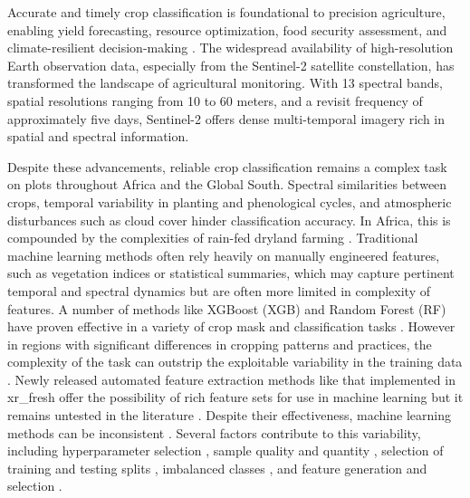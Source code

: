 \documentclass[pdflatex,sn-mathphys]{sn-jnl} %
\begin{document}
Accurate and timely crop classification is foundational to precision agriculture, enabling yield forecasting, resource optimization, food security assessment, and climate-resilient decision-making \cite{sciencedirect2023, ieee2017}. The widespread availability of high-resolution Earth observation data, especially from the Sentinel-2 satellite constellation, has transformed the landscape of agricultural monitoring. With 13 spectral bands, spatial resolutions ranging from 10 to 60 meters, and a revisit frequency of approximately five days, Sentinel-2 offers dense multi-temporal imagery rich in spatial and spectral information.

Despite these advancements, reliable crop classification remains a complex task on plots throughout Africa and the Global South. Spectral similarities between crops, temporal variability in planting and phenological cycles, and atmospheric disturbances such as cloud cover hinder classification accuracy. In Africa, this is compounded by the complexities of rain-fed dryland farming \cite{begue2020}. Traditional machine learning methods often rely heavily on manually engineered features, such as vegetation indices or statistical summaries, which may capture pertinent temporal and spectral dynamics but are often more limited in complexity of features. A number of methods like XGBoost (XGB) and Random Forest (RF) have proven effective in a variety of crop mask and classification tasks \cite{mahlayeye2024, mann2017, mann2019}. However in regions with significant differences in cropping patterns and practices, the complexity of the task can outstrip the exploitable variability in the training data \cite{mann2025, mahlayeye2024}. Newly released automated feature extraction methods like that implemented in xr\_fresh offer the possibility of rich feature sets for use in machine learning but it remains untested in the literature \cite{mann2025}. Despite their effectiveness, machine learning methods can be inconsistent \cite{feyisa2020}. Several factors contribute to this variability, including hyperparameter selection \cite{saini2018}, sample quality and quantity \cite{jin2019}, selection of training and testing splits \cite{belgiu2016}, imbalanced classes \cite{belgiu2016}, and feature generation and selection \cite{penabarragan2011}.  
\end{document}
